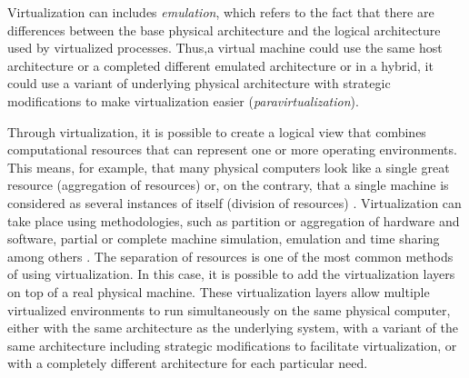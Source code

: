	Virtualization can includes \textit{emulation}, which refers to the fact that there are differences between the base physical architecture and the logical architecture used by virtualized processes. Thus,a virtual machine could use the same host architecture or a completed different emulated architecture or in a hybrid, it could use a variant of underlying physical architecture with strategic modifications to make virtualization easier (\textit{paravirtualization}).
	
	
	
	
	
	
	Through virtualization, it is possible to create a logical view that combines computational resources that can represent one or more operating environments. This means, for example, that many physical computers look like a single great resource (aggregation of resources) or, on the contrary, that a single machine is considered as several instances of itself (division of resources) \cite{Silberschatz2014}. Virtualization can take place using methodologies, such as partition or aggregation of hardware and software, partial or complete machine simulation, emulation and time sharing among others \cite{Chiueh2005, Hoopes2009}. The separation of resources is one of the most common methods of using virtualization. In this case, it is possible to add the virtualization layers on top of a real physical machine. These virtualization layers allow multiple virtualized environments to run simultaneously on the same physical computer, either with the same architecture as the underlying system, with a variant of the same architecture including strategic modifications to facilitate virtualization, or with a completely different architecture for each particular need.
 
